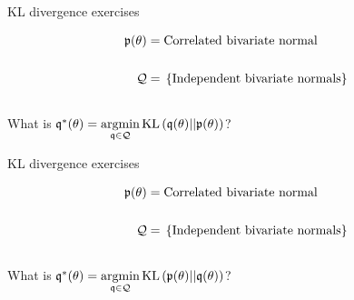
\begin{frame}{KL divergence exercises}
\begin{minipage}{0.5\textwidth}
\begin{align*}
%
\p(\theta) ={}& \textrm{Correlated bivariate normal}\\ \\
%
\qdom ={}& \left\{ \textrm{Independent bivariate normals}\right\}\\ \\
%
\end{align*}
%
What is
$\mathfrak{q}^*(\theta) = \underset{\mathfrak{q} \in \mathcal{Q}}{\mathrm{argmin}}\, \mathrm{KL}\left(\mathfrak{q}(\theta) || \mathfrak{p}(\theta) \right)$?
%
\end{minipage}
%
\begin{minipage}{0.4\textwidth}

\end{minipage}

\end{frame}





\begin{frame}{KL divergence exercises}
\begin{minipage}{0.5\textwidth}
\begin{align*}
%
\p(\theta) ={}& \textrm{Correlated bivariate normal}\\ \\
%
\qdom ={}& \left\{ \textrm{Independent bivariate normals}\right\}\\ \\
%
\end{align*}
%
What is
$\mathfrak{q}^*(\theta) ={} \underset{\mathfrak{q} \in \mathcal{Q}}{\mathrm{argmin}}\, \mathrm{KL}\left(\mathfrak{p}(\theta) || \mathfrak{q}(\theta) \right)$?
%
\end{minipage}
%
\begin{minipage}{0.4\textwidth}

\end{minipage}

\end{frame}




